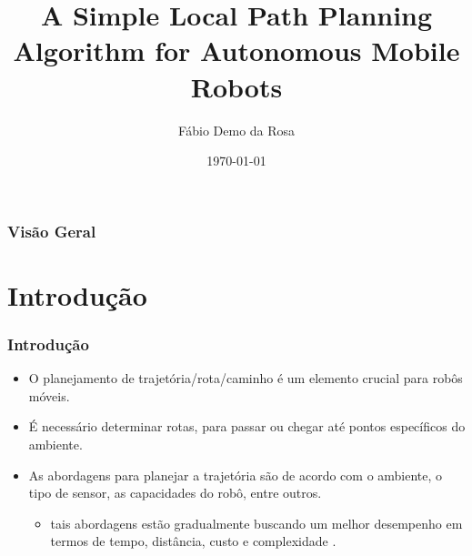 \documentclass[xcolor=dvipsnames, aspectratio=169]{beamer}
\title[A Simple Local Path Planning Algorithm for Autonomous Mobile Robots]{A Simple Local Path Planning Algorithm for Autonomous Mobile Robots} %
\author[FDR]{Fábio Demo da Rosa} %
\institute[UFSM] %
{
Universidade Federal de Santa Maria \\ %
Pós-Graduação em Ciência da Computação \\
Disciplina de Robótica Móvel\\
\medskip
\textit{faberdemo@gmail.com} %
}
\date{\today} %
\begin{document}
\begin{frame}
\titlepage %
\end{frame}

\begin{frame}
\frametitle{Visão Geral} %
\tableofcontents %
\end{frame}


\section{Introdução}
\begin{frame}[fragile]
  \frametitle{Introdução}
  \begin{itemize}
    \item O planejamento de trajetória/rota/caminho é um elemento crucial para robôs móveis.
    \item É necessário determinar rotas, para passar ou chegar até pontos específicos do ambiente.
    \item As abordagens para planejar a trajetória são de acordo com o ambiente, o tipo de sensor, as capacidades do robô, entre outros.
    \begin{itemize}
      \item tais abordagens estão gradualmente buscando um melhor desempenho em termos de tempo, distância, custo e complexidade \cite{buniyamin2011simple}.
    \end{itemize}
  \end{itemize}
\end{frame}

\end{document}
